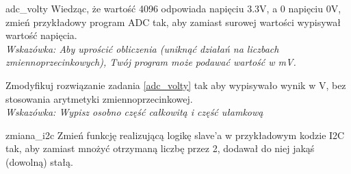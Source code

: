 \documentclass{pdfBooklets}
\begin{document}
\begin{Zadanie}{}{adc_volty}
Wiedząc, że wartość 4096 odpowiada napięciu 3.3V, a 0 napięciu 0V, zmień przykładowy program ADC tak, aby zamiast surowej
wartości wypisywał wartość napięcia.\\
\textit{Wskazówka: Aby uprościć obliczenia (uniknąć działań na liczbach zmiennoprzecinkowych), Twój program może podawać wartość w mV.}
\end{Zadanie}

\begin{Zadanie}{}{}
Zmodyfikuj rozwiązanie zadania \ref{adc_volty} tak aby wypisywało wynik w V, bez stosowania arytmetyki zmiennoprzecinkowej.\\
\textit{Wskazówka: Wypisz osobno część całkowitą i część ułamkową}
\end{Zadanie}

\begin{Zadanie}{}{zmiana_i2c}
  Zmień funkcję realizującą logikę slave'a w przykładowym kodzie I2C tak, aby zamiast mnożyć otrzymaną liczbę przez 2, dodawał do niej jakąś
  (dowolną) stałą.
\end{Zadanie}

\end{document}
